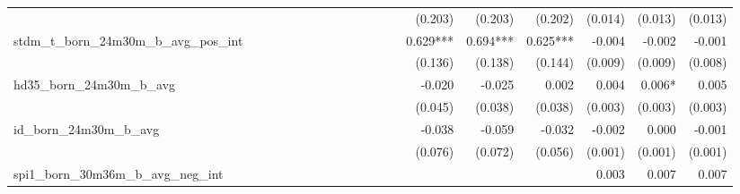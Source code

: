 \begin{tabular}{lrrrrrrrrrrrrrrrrrr}
                                            &              &              &              &              &              &              &              &              &               &              &              &               &      (0.203) &      (0.203) &       (0.202) &      (0.014) &      (0.013) &       (0.013) \\ 
stdm\_t\_born\_24m30m\_b\_avg\_pos\_int     &              &              &              &              &              &              &              &              &               &              &              &               &     0.629*** &     0.694*** &      0.625*** &       -0.004 &       -0.002 &        -0.001 \\ 
                                            &              &              &              &              &              &              &              &              &               &              &              &               &      (0.136) &      (0.138) &       (0.144) &      (0.009) &      (0.009) &       (0.008) \\ 
hd35\_born\_24m30m\_b\_avg                  &              &              &              &              &              &              &              &              &               &              &              &               &       -0.020 &       -0.025 &         0.002 &        0.004 &       0.006* &         0.005 \\ 
                                            &              &              &              &              &              &              &              &              &               &              &              &               &      (0.045) &      (0.038) &       (0.038) &      (0.003) &      (0.003) &       (0.003) \\ 
id\_born\_24m30m\_b\_avg                    &              &              &              &              &              &              &              &              &               &              &              &               &       -0.038 &       -0.059 &        -0.032 &       -0.002 &        0.000 &        -0.001 \\ 
                                            &              &              &              &              &              &              &              &              &               &              &              &               &      (0.076) &      (0.072) &       (0.056) &      (0.001) &      (0.001) &       (0.001) \\ 
spi1\_born\_30m36m\_b\_avg\_neg\_int        &              &              &              &              &              &              &              &              &               &              &              &               &              &              &               &        0.003 &        0.007 &         0.007 \\ 

\end{tabular}

